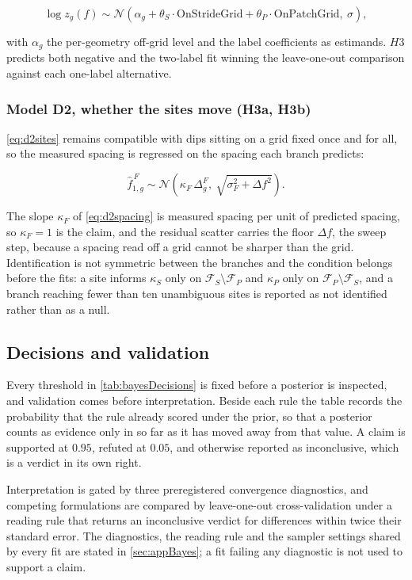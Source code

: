 \begin{equation}
\label{eq:d2sites}
\log z_g(f) \sim \mathcal{N}\!\left(
\alpha_g + \theta_S \cdot \text{OnStrideGrid} + \theta_P \cdot \text{OnPatchGrid},\ \sigma
\right),
\end{equation}

with $\alpha_g$ the per-geometry off-grid level and the label coefficients as estimands. $H3$ predicts both negative and the two-label fit winning the leave-one-out comparison against each one-label alternative.

\subsubsection*{Model D2, whether the sites move (H3a, H3b)}
\autoref{eq:d2sites} remains compatible with dips sitting on a grid fixed once and for all, so the measured spacing is regressed on the spacing each branch predicts:

\begin{equation}
\label{eq:d2spacing}
\hat f^{\,F}_{1,g} \sim \mathcal{N}\!\left(
\kappa_F \,\Delta^F_g,\ \sqrt{\sigma_F^2+\Delta f^2}
\right).
\end{equation}

The slope $\kappa_F$ of \autoref{eq:d2spacing} is measured spacing per unit of predicted spacing, so $\kappa_F=1$ is the claim, and the residual scatter carries the floor $\Delta f$, the sweep step, because a spacing read off a grid cannot be sharper than the grid. Identification is not symmetric between the branches and the condition belongs before the fits: a site informs $\kappa_S$ only on $\mathcal F_S \setminus \mathcal F_P$ and $\kappa_P$ only on $\mathcal F_P \setminus \mathcal F_S$, and a branch reaching fewer than ten unambiguous sites is reported as not identified rather than as a null.





\subsection{Decisions and validation}

Every threshold in \autoref{tab:bayesDecisions} is fixed before a posterior is inspected, and validation comes before interpretation. Beside each rule the table records the probability that the rule already scored under the prior, so that a posterior counts as evidence only in so far as it has moved away from that value. A claim is supported at $0.95$, refuted at $0.05$, and otherwise reported as inconclusive, which is a verdict in its own right.

Interpretation is gated by three preregistered convergence diagnostics, and competing formulations are compared by leave-one-out cross-validation under a reading rule that returns an inconclusive verdict for differences within twice their standard error. The diagnostics, the reading rule and the sampler settings shared by every fit are stated in \autoref{sec:appBayes}; a fit failing any diagnostic is not used to support a claim.
